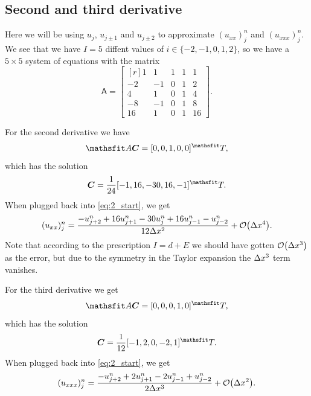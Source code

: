 \documentclass[11pt,letter, swedish, english
]{article}
\begin{document}

\subsection{Second and third derivative}
Here we will be using $u_j$, $u_{j\pm1}$ and $u_{j\pm2}$ to
approximate $(u_{xx})_j^n$ and $(u_{xxx})_j^n$. We see that we have
$I=5$ diffent values of $i\in\{-2, -1, 0, 1, 2\}$, so we have a
$5\times5$ system of equations with the matrix
\begin{equation}
\mathsf{A}=
\begin{bmatrix*}[r]
1&1&1&1&1\\
-2&-1&0&1&2\\
4&1&0&1&4\\
-8&-1&0&1&8\\
16&1&0&1&16
\end{bmatrix*}.
\end{equation}

For the second derivative we have
\begin{equation}
\mathsf{A}\vb*{C}=[0, 0, 1, 0, 0]^\mathsfrm{T},
\end{equation}
which has the solution
\begin{equation}
\vb*{C}=\frac{1}{24}[-1, 16, -30, 16, -1]^\mathsfrm{T}.
\end{equation}
When plugged back into \eqref{eq:2_start}, we get
\begin{equation}
(u_{xx})_j^n=\frac{-u_{j+2}^n+16u_{j+1}^n-30u_{j}^n+16u_{j-1}^n-u_{j-2}^n}{12\Dx^2}
+\order{\Dx^4}.
\end{equation}
Note that according to the prescription $I=d+E$ we should have gotten
$\order{\Dx^3}$ as the error, but due to the symmetry in the Taylor
expansion the $\Delta{x}^3$ term vanishes. 

For the third derivative we get
\begin{equation}
\mathsf{A}\vb*{C}=[0, 0, 0, 1, 0]^\mathsfrm{T},
\end{equation}
which has the solution
\begin{equation}
\vb*{C}=\frac{1}{12} [-1, 2, 0, -2, 1]^\mathsfrm{T}.
\end{equation}
When plugged back into \eqref{eq:2_start}, we get
\begin{equation}
(u_{xxx})_j^n=\frac{-u_{j+2}^n+2u_{j+1}^n-2u_{j-1}^n+u_{j-2}^n}{2\Dx^3}
+\order{\Dx^2}.
\end{equation}
\end{document}
